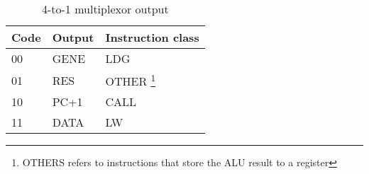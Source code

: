 \begin{savenotes}
\begin{table}[h]
\centering
    \begin{tabular}{| l | l | l |}
     \hline
     Code  & Output       & Instruction class \\
     \hline
     00    & GENE      &   LDG                \\
     01    & RES       &   OTHER \footnote{OTHERS refers to instructions that store the ALU result to a register }             \\
     10    & PC+1      &   CALL              \\
     11    & DATA      &   LW                \\
    \hline
    \end{tabular}
    
    \caption{4-to-1 multiplexor output}
    \label{fpga:tbl:to_reg_multiplexor_output_tbl}
    

\end{table}
\end{savenotes}